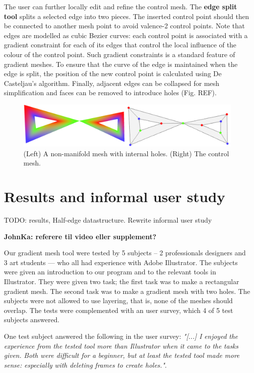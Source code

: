 \documentclass{egpubl}
\newcommand{\note}[3]{{\color{#2}\textbf{#1: #3}}}
\newcommand{\john}[1]{\note{JohnKa}{RubineRed}{#1}}
\begin{document}
	The user can further locally edit and refine the control mesh. The \textbf{edge split tool} splits a selected edge into two pieces. The inserted control point should then be connected to another mesh point to avoid valence-2 control points. Note that edges are modelled as cubic Bezier curves: each control point is associated with a gradient constraint for each of its edges that control the local influence of the colour of the control point. Such gradient constraints is a standard feature of gradient meshes. To ensure that the curve of the edge is maintained when the edge is split, the position of the new control point is calculated using De Casteljau's algorithm. Finally, adjacent edges can be collapsed for mesh simplification and faces can be removed to introduce holes (Fig. REF).
	
	\begin{figure}[t]
		\centering
		\includegraphics[width=\textwidth]{HoleAndNonManifoldMesh.png}
		\caption{(Left) A non-manifold mesh with internal holes. (Right) The control mesh.}
		\label{fig:nonManifoldHoleMesh}
	\end{figure}
	
	\section{Results and informal user study}
	\label{sec:results}
	
	TODO: results, Half-edge datastructure. Rewrite informal user study
	
	
	\john{referere til video eller supplement?}
	
	Our gradient mesh tool were tested by 5 subjects -- 2 professionals designers and 3 art students --- who all had experience with Adobe Illustrator. The subjects were given an introduction to our program and to the relevant tools in Illustrator. They were given two task; the first task was to make a rectangular gradient mesh. The second task was to make a gradient mesh with two holes. The subjects were not allowed to use layering, that is, none of the meshes should overlap. The tests were complemented with an user survey, which 4 of 5 test subjects answered.
	
	One test subject answered the following in the user survey: \textit{"[...] I enjoyed the experience from the tested tool more than Illustrator when it came to the tasks given. Both were difficult for a beginner, but at least the tested tool made more sense: especially with deleting frames to create holes."}.
	
\end{document}
